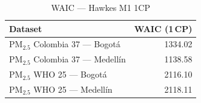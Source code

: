 \begin{table}[htbp]
\centering
\caption{WAIC --- Hawkes M1 1CP}
\label{tab:hawkes_waic_1cp}
\begin{tabular}{lr}
\toprule
Dataset & WAIC (1\,CP) \\
\midrule
PM$_{2.5}$ Colombia 37 --- Bogot\'{a} & 1334.02 \\
PM$_{2.5}$ Colombia 37 --- Medell\'{i}n & 1138.58 \\
PM$_{2.5}$ WHO 25 --- Bogot\'{a} & 2116.10 \\
PM$_{2.5}$ WHO 25 --- Medell\'{i}n & 2118.11 \\
\bottomrule
\end{tabular}
\end{table}
